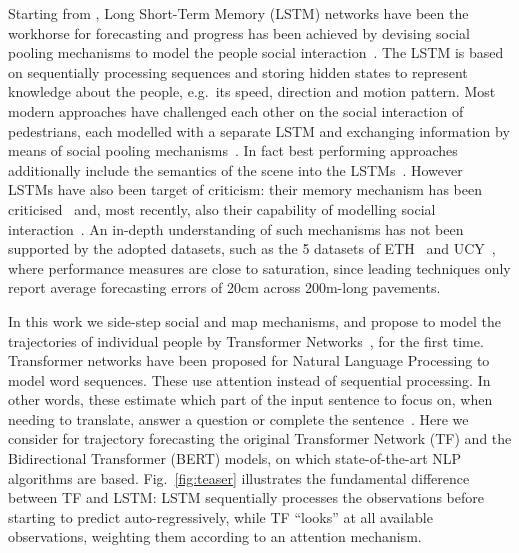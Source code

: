 \documentclass[a4paper,conference]{IEEEtran}
\begin{document}
Starting from \cite{alahi2016cvpr}, Long Short-Term Memory (LSTM) networks have been the workhorse for forecasting and progress has been achieved by devising social pooling mechanisms to model the people social interaction~\cite{alahi2016cvpr,gupta2018social}. The LSTM is based on sequentially processing sequences and storing hidden states to represent knowledge about the people, e.g.\ its speed, direction and motion pattern. Most modern approaches have challenged each other on the social interaction of pedestrians, each modelled with a separate LSTM and exchanging information by means of social pooling mechanisms~\cite{alahi2016cvpr,gupta2018social}. In fact best performing approaches additionally include the semantics of the scene into the LSTMs~\cite{kosaraju2019social,salzmann2020trajectron++,ivanovic2019trajectron,sadeghian2019sophie}. However LSTMs have also been target of criticism: their memory mechanism has been criticised~\cite{bai2018empirical,Luo18} and, most recently, also their capability of modelling social interaction~\cite{scholler2020constant,becker2018red,becker2018evaluation}. An in-depth understanding of such mechanisms has not been supported by the adopted datasets, such as the 5 datasets of ETH~\cite{pellegrini2009iccv} and UCY~\cite{lerner2007crowds}, where performance measures are close to saturation, since leading techniques only report average forecasting errors of 20cm across 200m-long pavements. 

In this work we side-step social and map mechanisms, and propose to model the trajectories of individual people by Transformer Networks~\cite{TransformersNIPS17}, for the first time. Transformer networks have been proposed for Natural Language Processing to model word sequences. These use attention instead of sequential processing. In other words, these estimate which part of the input sentence to focus on, when needing to translate, answer a question or complete the sentence~\cite{BERT19,SparseTF}. Here we consider for trajectory forecasting the original Transformer Network (TF) and the Bidirectional Transformer (BERT) models, on which state-of-the-art NLP algorithms are based. Fig.~\ref{fig:teaser} illustrates the fundamental difference between TF and LSTM: LSTM sequentially processes the observations before starting to predict auto-regressively, while TF ``looks'' at all available observations, weighting them according to an attention mechanism.
\end{document}
